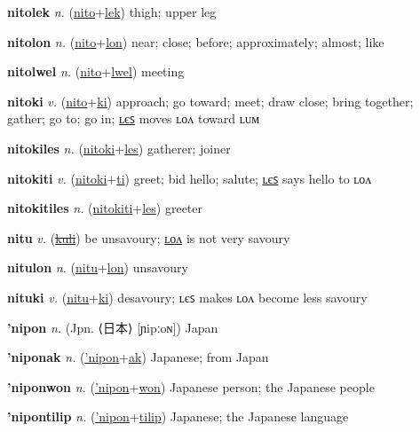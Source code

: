 \textbf{\hypertarget{nitolek}{nitolek}} \textit{n.} (\hyperlink{nito}{nito}+\allowbreak \hyperlink{lek}{lek})
thigh; upper leg

\textbf{\hypertarget{nitolon}{nitolon}} \textit{n.} (\hyperlink{nito}{nito}+\allowbreak \hyperlink{lon}{lon})
near; close; before; approximately; almost; like

\textbf{\hypertarget{nitolwel}{nitolwel}} \textit{n.} (\hyperlink{nito}{nito}+\allowbreak \hyperlink{lwel}{lwel})
meeting

\textbf{\hypertarget{nitoki}{nitoki}} \textit{v.} (\hyperlink{nito}{nito}+\allowbreak \hyperlink{ki}{ki})
approach; go toward; meet; draw close; bring together; gather; go to; go in; \hyperlink{nitokiles}{ʟєꜱ} moves ʟᴏᴧ toward ʟᴜᴍ

\textbf{\hypertarget{nitokiles}{nitokiles}} \textit{n.} (\hyperlink{nitoki}{nitoki}+\allowbreak \hyperlink{les}{les})
gatherer; joiner

\textbf{\hypertarget{nitokiti}{nitokiti}} \textit{v.} (\hyperlink{nitoki}{nitoki}+\allowbreak \hyperlink{ti}{ti})
greet; bid hello; salute; \hyperlink{nitokitiles}{ʟєꜱ} says hello to ʟᴏᴧ

\textbf{\hypertarget{nitokitiles}{nitokitiles}} \textit{n.} (\hyperlink{nitokiti}{nitokiti}+\allowbreak \hyperlink{les}{les})
greeter

\textbf{\hypertarget{nitu}{nitu}} \textit{v.} (\hyperlink{kuli}{\sout{kuli}})
be unsavoury; \hyperlink{nitulon}{ʟᴏᴧ} is not very savoury

\textbf{\hypertarget{nitulon}{nitulon}} \textit{n.} (\hyperlink{nitu}{nitu}+\allowbreak \hyperlink{lon}{lon})
unsavoury

\textbf{\hypertarget{nituki}{nituki}} \textit{v.} (\hyperlink{nitu}{nitu}+\allowbreak \hyperlink{ki}{ki})
desavoury; ʟєꜱ makes ʟᴏᴧ become less savoury

\textbf{\hypertarget{'nipon}{'nipon}} \textit{n.} (Jpn. ⟨{\japanese{}日本}⟩ [ɲipːoɴ])
Japan

\textbf{\hypertarget{'niponak}{'niponak}} \textit{n.} (\hyperlink{'nipon}{'nipon}+\allowbreak \hyperlink{ak}{ak})
Japanese; from Japan

\textbf{\hypertarget{'niponwon}{'niponwon}} \textit{n.} (\hyperlink{'nipon}{'nipon}+\allowbreak \hyperlink{won}{won})
Japanese person; the Japanese people

\textbf{\hypertarget{'nipontilip}{'nipontilip}} \textit{n.} (\hyperlink{'nipon}{'nipon}+\allowbreak \hyperlink{tilip}{tilip})
Japanese; the Japanese language

